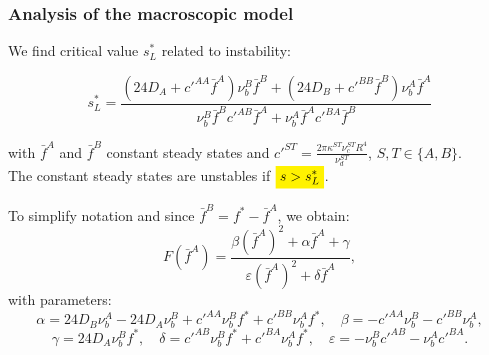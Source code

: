 \documentclass[10pt]{beamer}
\newcommand\eps{\varepsilon}
\newcommand\ka{\kappa}
\def \p {{\partial}}
\def \a {{\alpha}}
\def \b {{\beta}}
\def \g {{\gamma}}
\def \d {{\delta}}
\def \bfA {{\bar{f}^A}}
\def \bfB {{\bar{f}^B}}
\theoremstyle{remark}
\newcommand\Fontvii{\fontsize{9}{7.2}\selectfont}
\begin{document}
\newcommand{\highlight}[1]{%
	\colorbox{yellow}{$\displaystyle#1$}}

\begin{frame}
\frametitle{Analysis of the macroscopic model}
\Fontvii
We find critical value $s_{L}^{*}$ related to instability:

$$
s^{*}_{L}=\frac{(24 D_A+c'^{AA}\bfA)\nu_{b}^{B}\bfB+(24 D_B+c'^{BB}\bfB)\nu_{b}^{A}\bar{f}^A}{\nu_{b}^{B}\bfB c'^{AB}\bfA+\nu_{b}^{A}\bar{f}^A c'^{BA}\bfB}
$$

with $\bar{f}^A$ and $\bar{f}^B$ constant steady states and 
$c'^{ST}=\frac{2\pi  \ka^{ST} \nu_c^{ST} R^{4}}{\nu_d^{ST}}$, $S,T \in \{ A,B \}$. \\
The constant steady states are unstables if $\highlight{s>s^{*}_{L}}$.

To simplify notation and since $\bar{f}^B=f^*-\bar{f}^A$, 
we obtain:
$$F(\bfA)=\frac{ \b (\bfA)^2 + \a \bfA + \g}{ \eps(\bfA)^2+\d \bfA }, $$ 
with parameters:
$$
\a= 24D_B \nu_b^A -24 D_A \nu_b^B +c'^{AA} \nu_b^B f^* + c'^{BB} \nu_b^A f^*, \quad
\b=-c'^{AA} \nu_b^B -c'^{BB} \nu_b^A, $$
$$ \g= 24 D_A \nu_b^B f^*, \quad 
\d= c'^{AB}\nu_b^B f^*+c'^{BA} \nu_b^A f^*, \quad
\eps= -\nu_b^B c'^{AB}-	\nu_b^A c'^{BA}.
$$
\end{frame}
\end{document}
